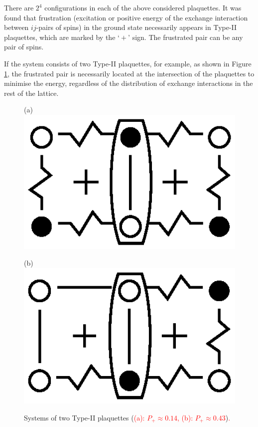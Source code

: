 \documentclass[preprint,12pt]{elsarticle}
\begin{document}
	
	There are $2^4$ configurations in each of the above considered plaquettes.
	It was found that frustration (excitation or positive energy of the exchange interaction between $ij$-pairs of spins) in the ground state necessarily appears in Type-II plaquettes, which are marked by the $‘+’$ sign. The frustrated pair can be any pair of spins.
	
	
	If the system consists of two Type-II plaquettes, for example, as shown in Figure \ref{fig:Type2_32}, the frustrated pair is necessarily located at the intersection of the plaquettes to minimise the energy, regardless of the distribution of exchange interactions in the rest of the lattice. 
	
	\begin{figure}[H]
		\centering
		\begin{minipage}{0.2\textwidth}
			\centering
			(a)
			\includegraphics[width=1\textwidth]{pictures/Type2_3x2.eps}
			\label{fig:Type2_3x2}
		\end{minipage}
		\hspace{20pt}
		\begin{minipage}{0.2\textwidth}
			\centering
			(b)
			\includegraphics[width=1\textwidth]{pictures/Type2_3x2_2.eps}
			\label{fig:Type2_3x2_2}
		\end{minipage}
		\caption{Systems of two Type-II plaquettes (\textcolor{red}{(a): $P_+\approx0.14$, (b): $P_+\approx0.43$})\textcolor{red}{.}}
		\label{fig:Type2_32}
	\end{figure}
	
\end{document}
